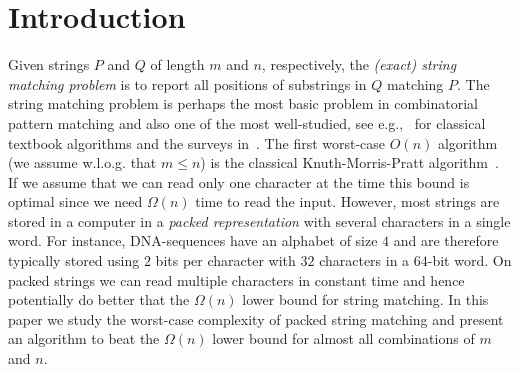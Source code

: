 \documentclass{article}
\begin{document}
\section{Introduction}
Given strings $P$ and $Q$ of length $m$ and $n$, respectively, the
\emph{(exact) string matching problem} is to report all positions of
substrings in $Q$ matching $P$. The string matching problem is perhaps
the most basic problem in combinatorial pattern matching and also one
of the most well-studied, see e.g.,~\cite{KMP1977, BM1977,KR1987,
  BYG1992} for classical textbook algorithms and the surveys
in~\cite{Gusfield1997, NR2002}. The first worst-case $O(n)$ algorithm
(we assume w.l.o.g. that $m \leq n$) is the classical
Knuth-Morris-Pratt algorithm~\cite{KMP1977}. If we assume that we can
read only one character at the time this bound is optimal since we
need $\Omega(n)$ time to read the input. However, most strings are
stored in a computer in a \emph{packed representation} with several
characters in a single word. For instance, DNA-sequences have an
alphabet of size $4$ and are therefore typically stored using $2$ bits
per character with $32$ characters in a $64$-bit word. On packed
strings we can read multiple characters in constant time and hence
potentially do better that the $\Omega(n)$ lower bound for string
matching. In this paper we study the worst-case complexity of packed
string matching and present an algorithm to beat the $\Omega(n)$ lower
bound for almost all combinations of $m$ and $n$.
\end{document}
